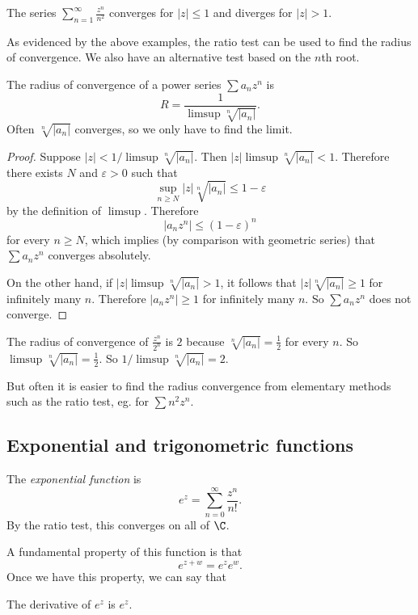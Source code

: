 \documentclass[a4paper]{article}
\begin{document}
\begin{eg}
  The series $\displaystyle \sum_{n = 1}^\infty \frac{z^{n}}{n^2}$ converges for $|z| \leq 1$ and diverges for $|z| > 1$.
\end{eg}

As evidenced by the above examples, the ratio test can be used to find the radius of convergence. We also have an alternative test based on the $n$th root.

\begin{lemma}
  The radius of convergence of a power series $\sum a_nz^n$ is
  \[
    R = \frac{1}{\limsup \sqrt[n]{|a_n|}}.
  \]
  Often $\sqrt[n]{|a_n|}$ converges, so we only have to find the limit.
\end{lemma}

\begin{proof}
  Suppose $|z| < 1/\limsup \sqrt[n]{|a_n|}$. Then $|z| \limsup \sqrt[n]{|a_n|} < 1$. Therefore there exists $N$ and $\varepsilon > 0$ such that
  \[
    \sup_{n \geq N}|z|\sqrt[n]{|a_n|} \leq 1 - \varepsilon
  \]
  by the definition of $\limsup$. Therefore
  \[
    |a_n z^n| \leq (1 - \varepsilon)^n
  \]
  for every $n \geq N$, which implies (by comparison with geometric series) that $\sum a_n z^n$ converges absolutely.

  On the other hand, if $|z|\limsup\sqrt[n]{|a_n|} > 1$, it follows that $|z|\sqrt[n]{|a_n|} \geq 1$ for infinitely many $n$. Therefore $|a_nz^n| \geq 1$ for infinitely many $n$. So $\sum a_nz^n$ does not converge.
\end{proof}

\begin{eg}
  The radius of convergence of $\displaystyle \frac{z^n}{2^n}$ is $2$ because $\sqrt[n]{|a_n|} = \frac{1}{2}$ for every $n$. So $\limsup \sqrt[n]{|a_n|} = \frac{1}{2}$. So $1/\limsup \sqrt[n]{|a_n|} = 2$.
\end{eg}

But often it is easier to find the radius convergence from elementary methods such as the ratio test, eg. for $\sum n^2 z^n$.

\subsection{Exponential and trigonometric functions}
\begin{defi}
  The \emph{exponential function} is
  \[
    e^z = \sum_{n = 0}^\infty \frac{z^n}{n!}.
  \]
  By the ratio test, this converges on all of $\C$.
\end{defi}
A fundamental property of this function is that
\[
  e^{z + w} = e^ze^w.
\]
Once we have this property, we can say that
\begin{prop}
  The derivative of $e^z$ is $e^z$.
\end{prop}
\end{document}
